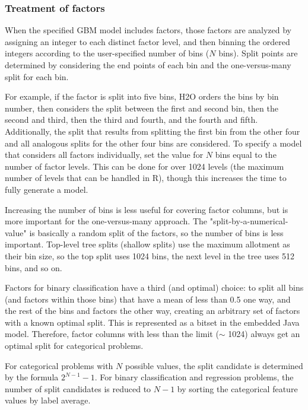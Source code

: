 \documentclass{article}[11pt]
\begin{document}
{\subsubsection{Treatment of factors}

When the specified GBM model includes factors, those factors are analyzed by assigning an integer to each distinct factor level, and then binning the ordered integers according to the user-specified number of bins ($N$ bins). Split points are determined by considering the end points of each bin and the one-versus-many split for each bin. 

For example, if the factor is split into five bins, H2O orders the bins by bin number, then considers the split between the first and second bin, then the second and third, then the third and fourth, and the fourth and fifth. Additionally, the split that results from splitting the first bin from the other four and all analogous splits for the other four bins are considered. To specify a model that considers all factors individually, set the value for $N$ bins equal to the number of factor levels. This can be done for over 1024 levels (the maximum number of levels that can be handled in R), though this increases the time to fully generate a model. 

Increasing the number of bins is less useful for covering factor columns, but is more important for the one-versus-many approach. The "split-by-a-numerical-value" is basically a random split of the factors, so the number of bins is less important. Top-level tree splits (shallow splits) use the maximum allotment as their bin size, so the top split uses 1024 bins, the next level in the tree uses 512 bins, and so on. 

Factors for binary classification have a third (and optimal) choice: to split all bins (and factors within those bins) that have a mean of less than 0.5 one way, and the rest of the bins and factors the other way, creating an arbitrary set of factors with a known optimal split. This is represented as a bitset in the embedded Java model. Therefore, factor columns with less than the limit ($\mathtt{\sim}$ 1024) always get an optimal split for categorical problems. 

For categorical problems with $N$ possible values, the split candidate is determined by the formula $2^{N-1}-1$. For binary classification and regression problems, the number of split candidates is reduced to $N-1$ by sorting the categorical feature values by label average. 


}
\end{document}
